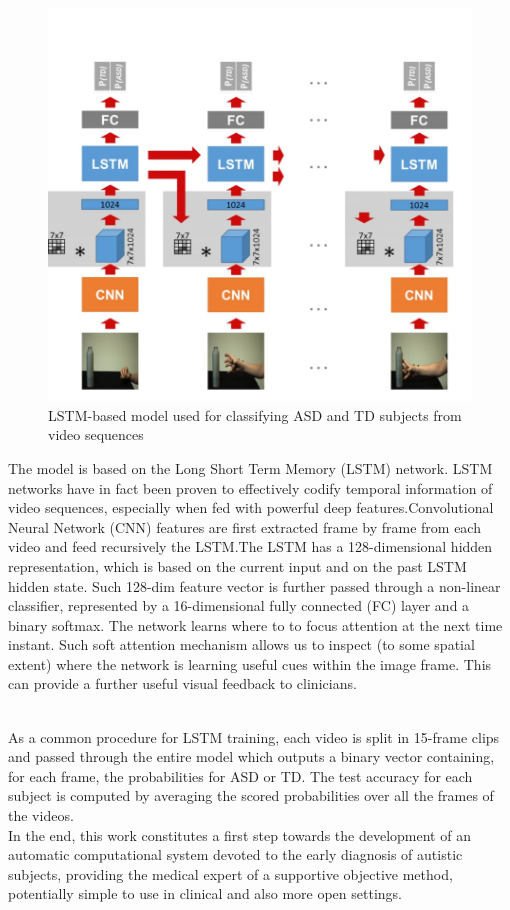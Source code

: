 \begin{figure}[h]
\label{ss}
\centering
\includegraphics[width= 15 cm]{review5.jpeg}
\caption{LSTM-based model used for classifying ASD and TD subjects from video sequences}
\end{figure}
The model is based on the Long Short Term Memory (LSTM) network. LSTM networks have in fact been proven to effectively codify temporal information of video sequences, especially when fed with powerful deep features.Convolutional Neural Network (CNN) features are ﬁrst extracted frame by frame from each video and feed recursively the LSTM.The LSTM has a 128-dimensional hidden representation, which is based on the current input and on the past LSTM hidden state. Such 128-dim feature vector is further passed through a non-linear classiﬁer, represented by a 16-dimensional fully connected (FC) layer and a binary softmax. The network learns where to to focus attention at the next time instant. Such soft attention mechanism allows us to inspect (to some spatial extent) where the network is learning useful cues within the image frame. This can provide a further useful visual feedback to clinicians. 

\\
As a common procedure for LSTM training, each video is split in 15-frame clips and passed through the entire model which outputs a binary vector containing, for each frame, the probabilities for ASD or TD. The test accuracy for each subject is computed by averaging the scored probabilities over all the frames of the videos.\\
In the end, this work constitutes a ﬁrst step towards the development of an automatic computational system devoted to the early diagnosis of autistic subjects, providing the medical expert of a supportive objective method, potentially simple to use in clinical and also more open settings.





